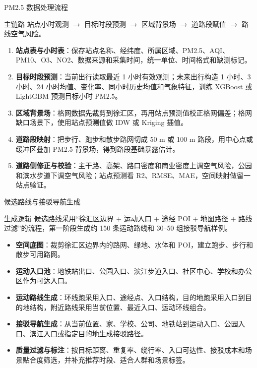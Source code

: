 \documentclass[xcolor=table,dvipsnames,svgnames,aspectratio=169]{ctexbeamer}
\newcommand{\kw}[1]{\textbf{\color{cprimary}#1}}
\newcommand{\smallitem}{\setlength{\itemsep}{0.25em}}
\begin{document}
\begin{frame}{PM2.5 数据处理流程}
  \scriptsize
  \begin{block}{主链路}
    站点小时观测 $\rightarrow$ 目标时段预测 $\rightarrow$ 区域背景场 $\rightarrow$ 道路段赋值 $\rightarrow$ 路线空气风险。
  \end{block}

  \vspace{0.1em}
  \begin{enumerate}
    \smallitem
    \item \kw{站点表与小时表}：保存站点名称、经纬度、所属区域、PM2.5、AQI、PM10、O3、NO2、数据来源和采集时间，统一单位、时间格式和缺测标记。
    \item \kw{目标时段预测}：当前出行读取最近 1 小时有效观测；未来出行构造 1 小时、3 小时、24 小时均值、变化率、同小时历史均值和气象特征，训练 XGBoost 或 LightGBM 预测目标小时 PM2.5。
    \item \kw{区域背景场}：格网数据先裁剪到徐汇区，再用站点预测值校正格网偏差；格网缺口场景下，使用站点预测值做 IDW 或 Kriging 插值。
    \item \kw{道路段映射}：把步行、跑步和散步路网切成 50 m 或 100 m 路段，用中心点或缓冲区叠加 PM2.5 背景场，得到路段基础暴露估计。
    \item \kw{道路侧修正与校验}：主干路、高架、路口密度和商业密度上调空气风险，公园和滨水步道下调空气风险；站点预测看 R2、RMSE、MAE，空间映射做留一站点验证。
  \end{enumerate}
\end{frame}

\begin{frame}{候选路线与接驳导航生成}
  \scriptsize
  \begin{block}{生成逻辑}
    候选路线采用“徐汇区边界 + 运动入口 + 途经 POI + 地图路径 + 路线过滤”的流程，第一阶段生成约 150 条运动路线和 30--50 组接驳导航样例。
  \end{block}

  \vspace{0.1em}
  \begin{itemize}
    \smallitem
    \item \kw{空间底图}：裁剪徐汇区边界内的路网、绿地、水体和 POI，建立跑步、步行和散步可用路网。
    \item \kw{运动入口池}：地铁站出口、公园入口、滨江步道入口、社区中心、学校和办公区作为可达入口。
    \item \kw{运动路线生成}：环线跑采用入口、途经点、入口结构，目的地跑采用入口到目的地结构，附近路线采用当前位置、最近入口、运动环线组合。
    \item \kw{接驳导航生成}：从当前位置、家、学校、公司、地铁站到运动入口、公园入口、滨江入口或指定目的地生成接驳路径。
    \item \kw{质量过滤与标注}：按目标距离、重复率、绕行率、入口可达性、接驳成本和场景贴合度筛选，并补充推荐时段、适合人群和场景标签。
  \end{itemize}
\end{frame}
\end{document}
